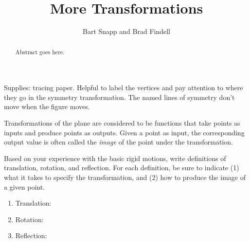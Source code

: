 \documentclass{ximera}
\title{More Transformations}
\author{Bart Snapp and Brad Findell}
\begin{document}
\begin{abstract}
Abstract goes here.  
\end{abstract}
\maketitle

\begin{teachingnote}
Supplies:  tracing paper.  Helpful to label the vertices and pay attention to where they go in the symmetry transformation.  The named lines of symmetry don't move when the figure moves.
\end{teachingnote}

Transformations of the plane are considered to be functions that take points as inputs and produce 
points as outputs.  Given a point as input, the corresponding output value is often called 
the \emph{image} of the point under the transformation.%
\begin{problem}
Based on your experience with the basic rigid motions, write definitions of translation, rotation, and reflection.%
For each definition, be sure to indicate (1) what it takes to specify the transformation, and (2) how to produce the image of a given point.  
\begin{enumerate}
\item Translation: 
\vspace{0.3in}
\item Rotation: 
\vspace{0.3in}
\item Reflection: 
\vspace{0.3in}
\end{enumerate}
\end{problem}
\end{document}
